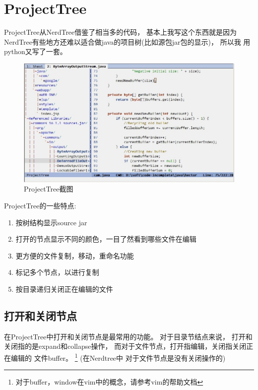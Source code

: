 \documentclass[oneside,openany]{book}
\begin{document}
\section{ProjectTree}

  ProjectTree从NerdTree借鉴了相当多的代码， 基本上我写这个东西就是因为
NerdTree有些地方还难以适合做java的项目树(比如源包jar包的显示)， 所以我
用python又写了一套。

  \begin{figure}[htbp]%
  \centering
  \includegraphics[scale=0.5]{tree.jpg}
  \caption{ProjectTree截图}
  \end{figure}

  ProjectTree的一些特点:
  \begin{enumerate}
    \item 按树结构显示source jar 
    \item 打开的节点显示不同的颜色，一目了然看到哪些文件在编辑
    \item 更方便的文件复制，移动，重命名功能
    \item 标记多个节点，以进行复制
    \item 按目录递归关闭正在编辑的文件
  \end{enumerate}

  \subsection{打开和关闭节点}
  在ProjectTree中打开和关闭节点是最常用的功能。 对于目录节结点来说，
打开和关闭指的是expand和collapse操作， 而对于文件节点，打开指编辑，关闭指关闭正在编辑的
文件buffer。 \footnote{对于buffer，window在vim中的概念，请参考vim的帮助文档} (在Nerdtree中
对于文件节点是没有关闭操作的)
  
\end{document}

